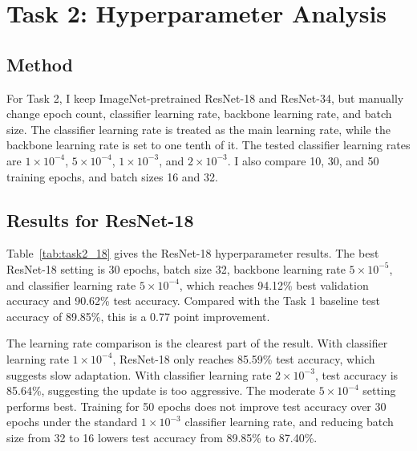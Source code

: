 \documentclass{article}
\begin{document}
\section{Task 2: Hyperparameter Analysis}

\subsection{Method}

For Task 2, I keep ImageNet-pretrained ResNet-18 and ResNet-34, but manually change epoch count, classifier learning rate, backbone learning rate, and batch size. The classifier learning rate is treated as the main learning rate, while the backbone learning rate is set to one tenth of it. The tested classifier learning rates are $1\times10^{-4}$, $5\times10^{-4}$, $1\times10^{-3}$, and $2\times10^{-3}$. I also compare 10, 30, and 50 training epochs, and batch sizes 16 and 32.

\subsection{Results for ResNet-18}

Table~\ref{tab:task2_18} gives the ResNet-18 hyperparameter results. The best ResNet-18 setting is 30 epochs, batch size 32, backbone learning rate $5\times10^{-5}$, and classifier learning rate $5\times10^{-4}$, which reaches 94.12\% best validation accuracy and 90.62\% test accuracy. Compared with the Task 1 baseline test accuracy of 89.85\%, this is a 0.77 point improvement.

\begin{table}[t]
  \caption{Task 2 hyperparameter analysis for ResNet-18.}
  \label{tab:task2_18}
  \centering
  \small
  
\end{table}

The learning rate comparison is the clearest part of the result. With classifier learning rate $1\times10^{-4}$, ResNet-18 only reaches 85.59\% test accuracy, which suggests slow adaptation. With classifier learning rate $2\times10^{-3}$, test accuracy is 85.64\%, suggesting the update is too aggressive. The moderate $5\times10^{-4}$ setting performs best. Training for 50 epochs does not improve test accuracy over 30 epochs under the standard $1\times10^{-3}$ classifier learning rate, and reducing batch size from 32 to 16 lowers test accuracy from 89.85\% to 87.40\%.
\end{document}
